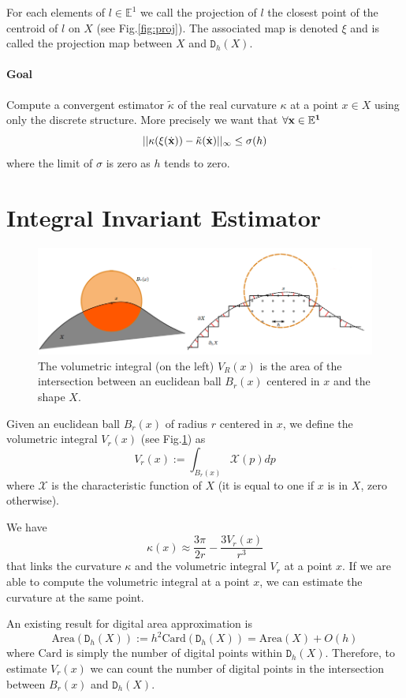 \documentclass[a4paper, 11pt]{article}
\begin{document}
For each elements of $l \in \mathbb{E}^1$ we call the projection of $l$ the closest point of the centroid of $l$ on $X$ (see Fig.\ref{fig:proj}). The associated
map is denoted $\xi$ and is called the projection map between $X$ and $\mathtt{D}_h(X)$.

\paragraph{Goal} Compute a convergent estimator $\tilde{\kappa}$ of the real curvature $\kappa$ at a point $x \in X$ using only the discrete structure. More precisely we want that $\forall \bf{x} \in \mathbb{E}^1$
\[
  || \kappa( \xi( \dot{\bf{x}} ) ) - \tilde{\kappa}( \dot{\bf{x}} ) ||_\infty \leq \sigma( h )
\]
where the limit of $\sigma$ is zero as $h$ tends to zero.

\section*{Integral Invariant Estimator}

\begin{figure}
  \centering
  \includegraphics[width=\textwidth]{integral}
  \caption{The volumetric integral (on the left) $V_R(x)$ is the area of the intersection between an euclidean ball $B_r(x)$ centered in $x$ and the shape $X$.}
  \label{fig:integral}
\end{figure}

Given an euclidean ball $B_r(x)$ of radius $r$ centered in $x$, we define the volumetric integral $V_r(x)$ (see Fig.\ref{fig:integral}) as
\[
  V_r(x) := \int_{B_r(x)} \mathcal{X}(p)dp
\]
where $\mathcal{X}$ is the characteristic function of $X$ (it is equal to one if $x$ is in $X$, zero otherwise).

We have
\[
  \kappa(x) \approx \frac{3 \pi}{2r} - \frac{3 V_r(x)}{r^3}
\]
that links the curvature $\kappa$ and the volumetric integral $V_r$ at a point $x$. If we are able to compute the volumetric integral at a point $x$,
we can estimate the curvature at the same point.

An existing result for digital area approximation is
\[
  \text{Area}( \mathtt{D}_h(X) ) := h^2 \text{Card}(\mathtt{D}_h(X)) = \text{Area}(X) + O(h)
\]
where $\text{Card}$ is simply the number of digital points within $\mathtt{D}_h(X)$. Therefore, to estimate $V_r(x)$ we can count the number of digital points in the intersection
between $B_r(x)$ and $\mathtt{D}_h(X)$.
\end{document}
